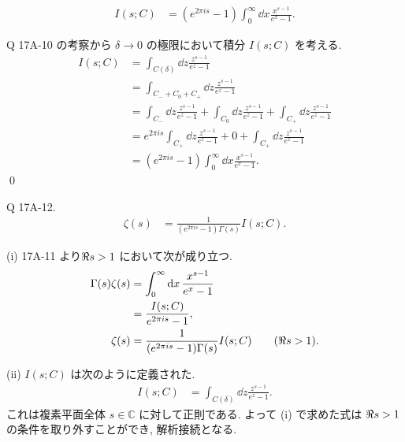 \documentclass[uplatex,dvipdfmx,a4paper,11pt]{jlreq}
\makeatletter
\newcommand{\CC}{\mathbb{C}}
\theoremstyle{definition}
\renewenvironment{proof}[1][\proofname]{\par
  \normalfont
  \topsep6\p@\@plus6\p@ \trivlist
  \item[\hskip\labelsep{\bfseries #1}\@addpunct{\bfseries}]\ignorespaces\quad\par
}{%
  \qed\endtrivlist\@endpefalse
}
\renewcommand\proofname{証明}
\makeatother
\begin{document}
\begin{proposition}
  \begin{align}
    I(s; C) & = (e^{2\pi is} - 1)\int_0^\infty\dd{x}\frac{x^{s-1}}{e^x - 1}.
  \end{align}
\end{proposition}
\begin{proof}
  Q 17A-10 の考察から $\delta\to 0$ の極限において積分 $I(s; C)$ を考える.
  \begin{align}
    I(s; C) & = \int_{C(\delta)}\dd{z}\frac{z^{s-1}}{e^z - 1}                                                                               \\
            & = \int_{C_- + C_0 + C_+}\dd{z}\frac{z^{s-1}}{e^z - 1}                                                                         \\
            & = \int_{C_-}\dd{z}\frac{z^{s-1}}{e^z - 1} + \int_{C_0}\dd{z}\frac{z^{s-1}}{e^z - 1} + \int_{C_+}\dd{z}\frac{z^{s-1}}{e^z - 1} \\
            & = e^{2\pi is}\int_{C_+}\dd{z}\frac{z^{s-1}}{e^z - 1} + 0 + \int_{C_+}\dd{z}\frac{z^{s-1}}{e^z - 1}                            \\
            & = (e^{2\pi is} - 1)\int_{0}^\infty\dd{x}\frac{x^{s-1}}{e^x - 1}.
  \end{align}
\end{proof}

\begin{itembox}[l]{Q 17A-12.}
  \begin{align}
    \zeta(s) & = \frac{1}{(e^{2\pi is} - 1)\Gamma(s)}I(s; C).
  \end{align}
\end{itembox}

(i) 17A-11 より$\real s > 1$ において次が成り立つ.
\begin{align}
  \Gamma(s)\zeta(s) & = \int_0^\infty\dd{x}\frac{x^{s-1}}{e^x - 1}                        \\
                    & = \frac{I(s; C)}{e^{2\pi is} - 1},                                  \\
  \zeta(s)          & = \frac{1}{(e^{2\pi is} - 1)\Gamma(s)}I(s; C) \qquad (\real s > 1).
\end{align}

(ii)
$I(s; C)$ は次のように定義された.
\begin{align}
  I(s; C) & = \int_{C(\delta)}\dd{z}\frac{z^{s-1}}{e^z - 1}.
\end{align}
これは複素平面全体 $s\in\CC$ に対して正則である. よって (i) で求めた式は $\real s > 1$ の条件を取り外すことができ, 解析接続となる.
\end{document}
